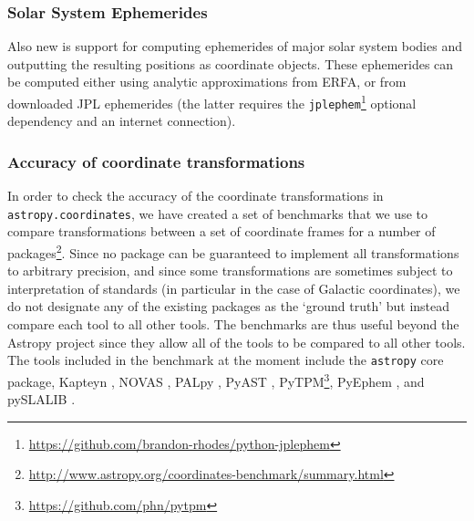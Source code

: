 \documentclass[modern]{aastex61}
\newcommand{\package}[1]{\texttt{#1}\xspace}
\newcommand{\astropy}{Astropy\xspace}
\newcommand{\astropypkg}{\package{astropy}}
\newcommand{\inlinecomment}[2]{\todo[inline]{#1: #2}\xspace}
\begin{document}


\subsubsection{Solar System Ephemerides}
    Also new is support for computing ephemerides of major solar system bodies
    and outputting the resulting positions as coordinate objects.
    These ephemerides can be computed either using analytic approximations from
    ERFA, or from downloaded JPL ephemerides (the latter requires the
    \package{jplephem}\footnote{\url{https://github.com/brandon-rhodes/python-jplephem}}
    optional dependency and an internet connection).


\subsubsection{Accuracy of coordinate transformations}

In order to check the accuracy of the coordinate transformations in \package{astropy.coordinates}, we have created a set of benchmarks that we use to compare transformations between a set of coordinate frames for a number of packages\footnote{\url{http://www.astropy.org/coordinates-benchmark/summary.html}}. Since
no package can be guaranteed to implement all transformations to arbitrary precision, and since some transformations are sometimes subject to interpretation of standards (in particular in the case of Galactic coordinates), we do not designate any of the existing packages as the `ground truth' but instead compare each tool to all other tools. The benchmarks are thus useful beyond the \astropy project since they allow all of the tools to be compared to all other tools. The tools included in the benchmark at the moment include the \astropypkg core package, Kapteyn \citep{kapteyn}, NOVAS \citep{novas}, PALpy \citep{pal}, PyAST \citep[a wrapper for AST, described in][]{ast}, PyTPM\footnote{\url{https://github.com/phn/pytpm}}, PyEphem \citep{pyephem}, and pySLALIB \citep[a Python wrapper for SLALIB, described in][]{slalib}.
\end{document}
